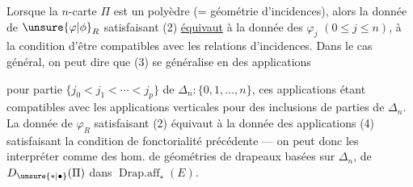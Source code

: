 Lorsque la $n$-carte $\Pi$ est un polyèdre (= géométrie d'incidences), alors la donnée de $\unsure{\varphi|\phi}_R$ satisfaisant (2) \uline{équivaut} à la donnée des $\varphi_j$ $(0\leq j\leq n)$,  à la condition d'être compatibles avec les relations d'incidences. Dans le cas général, on peut dire  que (3) se généralise en des applications


pour  partie $\{j_0<j_1<\cdots<j_p\}$ de $\Delta_n:\{0,1,\ldots,n\}$, ces applications étant compatibles avec les applications verticales pour des inclusions de parties de $\Delta_n$. La donnée de $\varphi_R$ satisfaisant (2) équivaut à la donnée des applications (4) satisfaisant la condition de fonctorialité précédente --- on peut donc les interpréter  comme des hom. de géométries de drapeaux basées sur  $\Delta_n$, de $D_{\unsure{*|\bullet}}(\Pi)$ dans $\operatorname{Drap.aff}_*(E)$.
